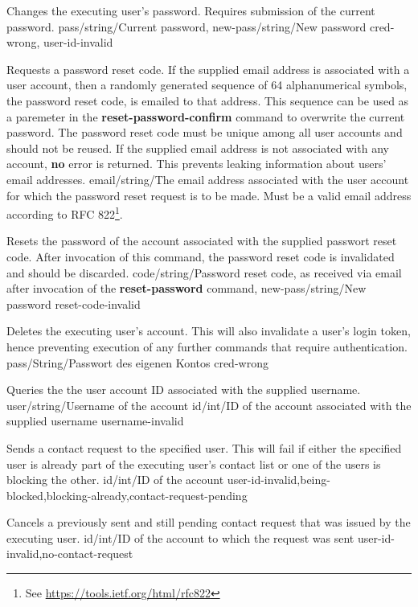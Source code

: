 \documentclass[parskip=full,11pt]{scrartcl}
\begin{document}
{Changes the executing user's password.
Requires submission of the current password.}
{pass/string/Current password,
new-pass/string/New password}
{}
{cred-wrong, user-id-invalid}
{}

{Requests a password reset code.
If the supplied email address is associated with a user account, then a
randomly generated sequence of 64 alphanumerical symbols, the password reset
code, is emailed to that address.
This sequence can be used as a paremeter in the \textbf{reset-password-confirm}
command to overwrite the current password.
The password reset code must be unique among all user accounts and should not
be reused.
If the supplied email address is not associated with any account, \textbf{no}
error is returned.
This prevents leaking information about users' email addresses.}
{email/string/The email address associated with the user account for which the
password reset request is to be made.
Must be a valid email address according to
RFC 822\footnote{See \url{https://tools.ietf.org/html/rfc822}}.}
{}
{}
{}

{Resets the password of the account associated with the supplied passwort reset
code.
After invocation of this command, the password reset code is invalidated and
should be discarded.}
{code/string/Password reset code{,} as received via email after invocation of
    the \textbf{reset-password} command,
new-pass/string/New password}
{}
{reset-code-invalid}
{}

{Deletes the executing user's account.
This will also invalidate a user's login token, hence preventing execution of
any further commands that require authentication.}
{pass/String/Passwort des eigenen Kontos}
{}
{cred-wrong}
{}

{Queries the the user account ID associated with the supplied username.}
{user/string/Username of the account}
{id/int/ID of the account associated with the supplied username}
{username-invalid}
{}

{Sends a contact request to the specified user.
This will fail if either the specified user is already part of the executing
user's contact list or one of the users is blocking the other.}
{id/int/ID of the account}
{}
{user-id-invalid,being-blocked,blocking-already,contact-request-pending}
{}

{Cancels a previously sent and still pending contact request that was issued
by the executing user.}
{id/int/ID of the account to which the request was sent}
{}
{user-id-invalid,no-contact-request}
{}
\end{document}
